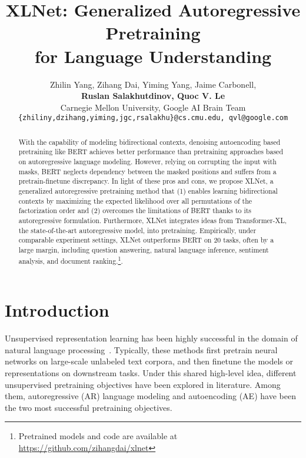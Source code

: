 \documentclass{article}
\title{XLNet: Generalized Autoregressive Pretraining \\ for Language Understanding}
\author{Zhilin Yang, Zihang Dai, Yiming Yang, Jaime Carbonell, \\
  {\bf Ruslan Salakhutdinov, Quoc V. Le}\\
  Carnegie Mellon University, Google AI Brain Team \\
  {\small \texttt{\{zhiliny,dzihang,yiming,jgc,rsalakhu\}@cs.cmu.edu, qvl@google.com} } 
}
\begin{document}
\maketitle

\renewcommand{\thefootnote}{\fnsymbol{footnote}}
\renewcommand{\thefootnote}{\arabic{footnote}}


\begin{abstract}
With the capability of modeling bidirectional contexts, denoising autoencoding based pretraining like BERT achieves better performance than pretraining approaches based on autoregressive language modeling.
However, relying on corrupting the input with masks, BERT neglects dependency between the masked positions and suffers from a pretrain-finetune discrepancy.
In light of these pros and cons, we propose XLNet, a generalized autoregressive pretraining method that (1) enables learning bidirectional contexts by maximizing the expected likelihood over all permutations of the factorization order and (2) overcomes the limitations of BERT thanks to its autoregressive formulation.
Furthermore, XLNet integrates ideas from Transformer-XL, the state-of-the-art autoregressive model, into pretraining.
Empirically, under comparable experiment settings, XLNet outperforms BERT on 20 tasks, often by a large margin, including question answering, natural language inference, sentiment analysis, and document ranking.\footnote{Pretrained models and code are available at \url{https://github.com/zihangdai/xlnet}}.



















\end{abstract}
 
\section{Introduction}

Unsupervised representation learning has been highly successful in the domain of natural language processing~\cite{dai2015semi,mccann2017learned,peters2018deep,radford2018improving,devlin2018bert}.
Typically, these methods first pretrain neural networks on large-scale unlabeled text corpora, and then finetune the models or representations on downstream tasks.
Under this shared high-level idea, different unsupervised pretraining objectives have been explored in literature.
Among them, autoregressive (AR) language modeling and autoencoding (AE) have been the two most successful pretraining objectives.
\end{document}
